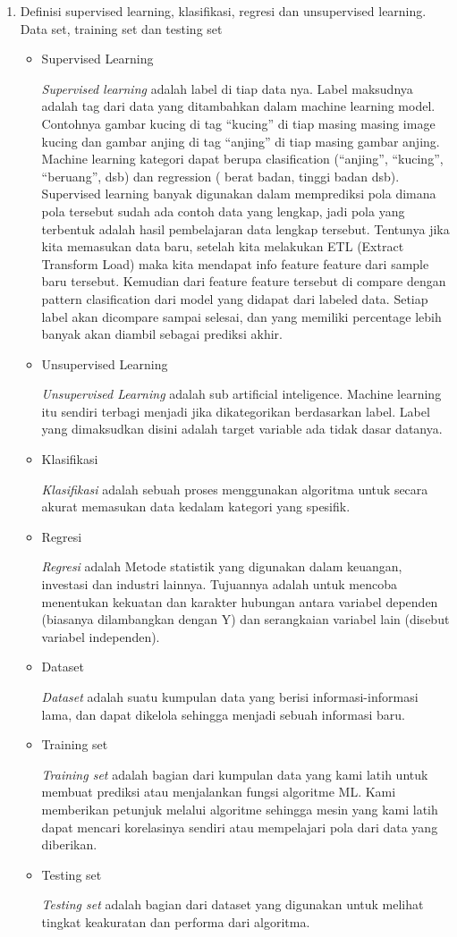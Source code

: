 \begin{enumerate}
	
	\item Definisi supervised learning, klasifikasi, regresi dan unsupervised learning. Data set, training set dan testing set
	\begin{itemize}
		\item Supervised Learning
		\par
		\textit{Supervised learning}
		adalah  label di tiap data nya. Label maksudnya adalah tag dari data yang ditambahkan dalam machine learning model. Contohnya gambar kucing di tag “kucing” di tiap masing masing image kucing dan gambar anjing di tag “anjing” di tiap masing gambar anjing. Machine learning kategori dapat berupa clasification (“anjing”, “kucing”, “beruang”, dsb) dan regression ( berat badan, tinggi badan dsb). Supervised learning banyak digunakan dalam memprediksi pola dimana pola tersebut sudah ada contoh data yang lengkap, jadi pola yang terbentuk adalah hasil pembelajaran data lengkap tersebut. Tentunya jika kita memasukan data baru, setelah kita melakukan ETL (Extract Transform Load) maka kita mendapat info feature feature dari sample baru tersebut. Kemudian dari feature feature tersebut di compare dengan pattern clasification dari model yang didapat dari labeled data. Setiap label akan dicompare sampai selesai, dan yang memiliki percentage lebih banyak akan diambil sebagai prediksi akhir.
		\item Unsupervised Learning
		\par
		\textit{Unsupervised Learning} adalah sub artificial inteligence. Machine learning itu sendiri terbagi menjadi jika dikategorikan berdasarkan label. Label yang dimaksudkan disini adalah target variable ada tidak dasar datanya.
		\item Klasifikasi
		\par
		\textit{Klasifikasi} adalah sebuah proses menggunakan algoritma untuk secara akurat memasukan data kedalam kategori yang spesifik.
		\item Regresi
		\par
		\textit{Regresi} adalah Metode statistik yang digunakan dalam keuangan, investasi dan industri lainnya. Tujuannya adalah untuk mencoba menentukan kekuatan dan karakter hubungan antara  variabel dependen (biasanya dilambangkan dengan Y) dan serangkaian variabel lain (disebut variabel independen).
		\item Dataset
		\par
		\textit{Dataset} adalah suatu kumpulan data yang berisi informasi-informasi lama, dan dapat dikelola sehingga menjadi sebuah informasi baru.
		\item Training set
		\par
		\textit{Training set} adalah bagian dari kumpulan data yang kami latih untuk membuat prediksi atau menjalankan fungsi algoritme ML. Kami memberikan petunjuk melalui algoritme sehingga mesin yang kami latih dapat mencari korelasinya sendiri atau mempelajari pola dari data yang diberikan.
		\item Testing set
		\par
		\textit{Testing set} adalah bagian dari dataset yang digunakan untuk melihat tingkat keakuratan dan performa dari algoritma.
	\end{itemize}
	

\end{enumerate}
